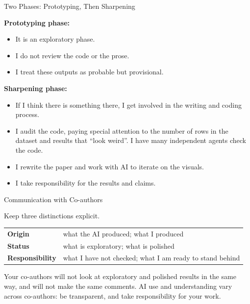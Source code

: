 \documentclass[svgnames,x11names,dvipsnames]{beamer}
\begin{document}
\begin{frame}{Two Phases: Prototyping, Then Sharpening}

\textbf{Prototyping phase:}
\begin{itemize}
    \setlength{\itemsep}{3pt}
    \item It is an exploratory phase.
    \item I do not review the code or the prose.
    \item I treat these outputs as probable but provisional.
\end{itemize}

\vspace{0.4cm}

\textbf{Sharpening phase:}
\begin{itemize}
    \setlength{\itemsep}{3pt}
    \item If I think there is something there, I get involved in the writing and coding process.
    \item I audit the code, paying special attention to the number of rows in the dataset and results that ``look weird''. I have many independent agents check the code.
    \item I rewrite the paper and work with AI to iterate on the visuals.
    \item I take responsibility for the results and claims.
\end{itemize}

\end{frame}

\begin{frame}{Communication with Co-authors}

\small
Keep three distinctions explicit.

\vspace{0.15cm}
{\footnotesize
\begin{tabular}{@{}ll@{}}
\toprule
\textbf{Origin} & what the AI produced; what I produced \\
\textbf{Status} & what is exploratory; what is polished \\
\textbf{Responsibility} & what I have not checked; what I am ready to stand behind \\
\bottomrule
\end{tabular}}

\vspace{0.3cm}

Your co-authors will not look at exploratory and polished results in the same way, and will not make the same comments. AI use and understanding vary across co-authors: be transparent, and take responsibility for your work.

\vspace{0.3cm}

\end{frame}
\end{document}
